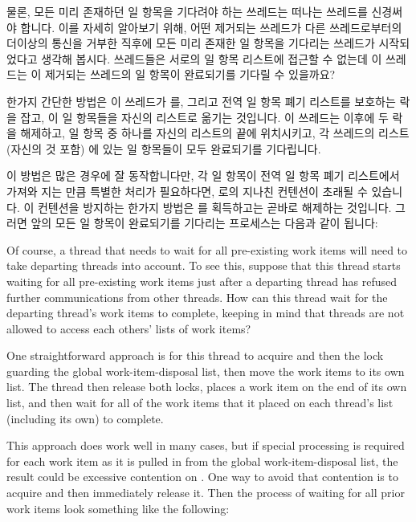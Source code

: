 {\begin{enumerate}
	\fi

	\end{enumerate}

	물론, 모든 미리 존재하던 일 항목을 기다려야 하는 쓰레드는 떠나는
	쓰레드를 신경써야 합니다.
	이를 자세히 알아보기 위해, 어떤 제거되는 쓰레드가 다른 쓰레드로부터의
	더이상의 통신을 거부한 직후에 모든 미리 존재한 일 항목을 기다리는
	쓰레드가 시작되었다고 생각해 봅시다.
	쓰레드들은 서로의 일 항목 리스트에 접근할 수 없는데 이 쓰레드는 이
	제거되는 쓰레드의 일 항목이 완료되기를 기다릴 수 있을까요?

	한가지 간단한 방법은 이 쓰레드가  를, 그리고 전역 일 항목 폐기
	리스트를 보호하는 락을 잡고, 이 일 항목들을 자신의 리스트로 옮기는
	것입니다.
	이 쓰레드는 이후에 두 락을 해제하고, 일 항목 중 하나를 자신의 리스트의
	끝에 위치시키고, 각 쓰레드의 리스트 (자신의 것 포함) 에 있는 일
	항목들이 모두 완료되기를 기다립니다.

	이 방법은 많은 경우에 잘 동작합니다만, 각 일 항목이 전역 일 항목 폐기
	리스트에서 가져와 지는 만큼 특별한 처리가 필요하다면,  로의
	지나친 컨텐션이 초래될 수 있습니다.
	이 컨텐션을 방지하는 한가지 방법은  를 획득하고는 곧바로 해제하는
	것입니다.
	그러면 앞의 모든 일 항목이 완료되기를 기다리는 프로세스는 다음과 같이
	됩니다:

	\iffalse

	Of course, a thread that needs to wait for all pre-existing work
	items will need to take departing threads into account.
	To see this, suppose that this thread starts waiting for all
	pre-existing work items just after a departing thread has refused
	further communications from other threads.
	How can this thread wait for the departing thread's work items
	to complete, keeping in mind that threads are not allowed to
	access each others' lists of work items?

	One straightforward approach is for this thread to acquire 
	and then the lock guarding the global work-item-disposal list, then
	move the work items to its own list.
	The thread then release both locks,
	places a work item on the end of its own list,
	and then wait for all of the work items that it placed on each thread's
	list (including its own) to complete.

	This approach does work well in many cases, but if special
	processing is required for each work item as it is pulled in
	from the global work-item-disposal list, the result could be
	excessive contention on .
	One way to avoid that contention is to acquire  and then
	immediately release it.
	Then the process of waiting for all prior work items look
	something like the following:

}
